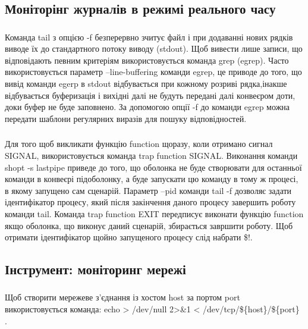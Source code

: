 \documentclass[t]{beamer}  %
\begin{document}
\subsection{Моніторінг журналів в режимі реального часу}

\begin{frame}
	\frametitle{\insertsection} 
	\framesubtitle{\insertsubsection}
Команда tail з опцією -f безперервно зчитує файл і при додаванні нових рядків виводе їх до стандартного потоку виводу (stdout). Щоб вивести лише записи, що відповідають певним критеріям використовується команда grep (egrep). Часто використовується параметр --line-buffering команди egrep, це приводе до того, що вивід команди egerp в stdout відбувається при кожному розриві рядка,інакше відбувається буферизація і вихідні далі не будуть передані далі конвеєром доти, доки буфер не буде заповнено. За допомогою опції -f до команди egrep можна передати шаблони регулярних виразів для пошуку відповідностей.
\end{frame}

\begin{frame}
	\frametitle{\insertsection} 
	\framesubtitle{\insertsubsection}
Для того щоб викликати функцію function щоразу, коли отримано сигнал SIGNAL, використовується команда trap function SIGNAL. Виконання команди shopt -s lastpipe приведе до того, що оболонка не буде створювати для останньої команди в конвеєрі підоболонку, а буде запускати цю команду в тому ж процесі, в якому запущено сам сценарій. Параметр --pid команди tail -f дозволяє задати ідентифікатор процесу, який після закінчення даного процесу завершить роботу команди tail. Команда trap function EXIT передписує виконати функцію function якщо оболонка, що виконує даний сценарій, збирається завршити роботу. Щоб отримати ідентифікатор щойно запущеного процесу слід набрати \$!.
\end{frame}

\subsection{Інструмент: моніторинг мережі}
\begin{frame}
 	\frametitle{\insertsection} 
 	\framesubtitle{\insertsubsection}
Щоб створити мережеве з'єднання із хостом host за портом port використовується команда: echo > /dev/null 2>\&1 < /dev/tcp/\$\{host\}/\$\{port\} .
 \end{frame}
\end{document}
